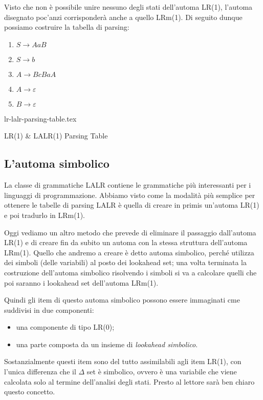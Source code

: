 \documentclass[class=book, crop=false, oneside, 12pt]{standalone}
\begin{document}
Visto che non è possibile unire nessuno degli stati dell'automa LR(1), l'automa disegnato poc'anzi corrisponderà anche a quello LRm(1). Di seguito dunque possiamo costruire la tabella di parsing:

\begin{enumerate}
    \item \(S \to AaB\) 
    \item \(S \to b\) 
    \item \(A \to BcBaA\) 
    \item \(A \to \varepsilon\) 
    \item \(B \to \varepsilon\)
\end{enumerate}

\begin{table}[H]
    \centering
    {lr-lalr-parsing-table.tex}
    \caption{LR(1) \& LALR(1) Parsing Table}
    \label{tab:lr-lalr-parsing-table}
\end{table}


\subsection{L'automa simbolico}
La classe di grammatiche LALR contiene le grammatiche più interessanti per i linguaggi di programmazione.
Abbiamo visto come la modalità più semplice per ottenere le tabelle di parsing LALR è quella di creare in primis un'automa LR(1) e poi tradurlo in LRm(1).

Oggi vediamo un altro metodo che prevede di eliminare il passaggio dall'automa LR(1) e di creare fin da subito un automa con la stessa struttura dell'automa LRm(1).
Quello che andremo a creare è detto automa simbolico, perché utilizza dei simboli (delle variabili) al posto dei lookahead set; una volta terminata la costruzione dell'automa simbolico risolvendo i simboli si va a calcolare quelli che poi saranno i lookahead set dell'automa LRm(1).

Quindi gli item di questo automa simbolico possono essere immaginati cme suddivisi in due componenti:
\begin{itemize}
    \item una componente di tipo LR(0);
    \item una parte composta da un insieme di \emph{lookahead simbolico}.
\end{itemize}
Sostanzialmente questi item sono del tutto assimilabili agli item LR(1), con l'unica differenza che il \(\Delta\) set è simbolico, ovvero è una variabile che viene calcolata solo al termine dell'analisi degli stati. Presto al lettore sarà ben chiaro questo concetto.
\end{document}
